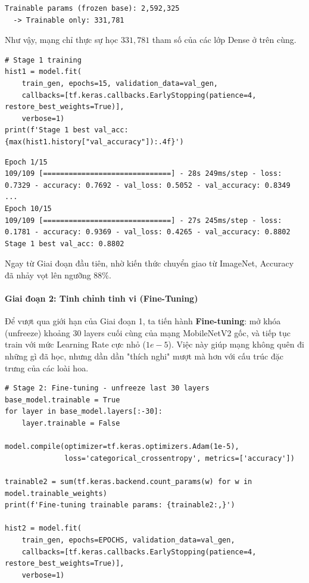 \begin{lstlisting}[style=consoleoutput, caption={Output: Kiểm tra số lượng tham số huấn luyện}]
Trainable params (frozen base): 2,592,325
  -> Trainable only: 331,781
\end{lstlisting}

Như vậy, mạng chỉ thực sự học $331,781$ tham số của các lớp Dense ở trên cùng.

\begin{lstlisting}[style=pythoncode, caption={Huấn luyện Stage 1}]
# Stage 1 training
hist1 = model.fit(
    train_gen, epochs=15, validation_data=val_gen,
    callbacks=[tf.keras.callbacks.EarlyStopping(patience=4, restore_best_weights=True)],
    verbose=1)
print(f'Stage 1 best val_acc: {max(hist1.history["val_accuracy"]):.4f}')
\end{lstlisting}

\begin{lstlisting}[style=consoleoutput, caption={Output: Huấn luyện Giai đoạn 1}]
Epoch 1/15
109/109 [==============================] - 28s 249ms/step - loss: 0.7329 - accuracy: 0.7692 - val_loss: 0.5052 - val_accuracy: 0.8349
...
Epoch 10/15
109/109 [==============================] - 27s 245ms/step - loss: 0.1781 - accuracy: 0.9369 - val_loss: 0.4265 - val_accuracy: 0.8802
Stage 1 best val_acc: 0.8802
\end{lstlisting}

Ngay từ Giai đoạn đầu tiên, nhờ kiến thức chuyển giao từ ImageNet, Accuracy đã nhảy vọt lên ngưỡng $88\%$.

\paragraph{Giai đoạn 2: Tinh chỉnh tinh vi (Fine-Tuning)} \hfill\mbox{}

Để vượt qua giới hạn của Giai đoạn 1, ta tiến hành \textbf{Fine-tuning}: mở khóa (unfreeze) khoảng 30 layers cuối cùng của mạng MobileNetV2 gốc, và tiếp tục train với mức Learning Rate cực nhỏ ($1e-5$). Việc này giúp mạng không quên đi những gì đã học, nhưng dần dần "thích nghi" mượt mà hơn với cấu trúc đặc trưng của các loài hoa.

\begin{lstlisting}[style=pythoncode, caption={Mở băng các layers và huấn luyện Stage 2}]
# Stage 2: Fine-tuning - unfreeze last 30 layers
base_model.trainable = True
for layer in base_model.layers[:-30]:
    layer.trainable = False

model.compile(optimizer=tf.keras.optimizers.Adam(1e-5),
              loss='categorical_crossentropy', metrics=['accuracy'])

trainable2 = sum(tf.keras.backend.count_params(w) for w in model.trainable_weights)
print(f'Fine-tuning trainable params: {trainable2:,}')

hist2 = model.fit(
    train_gen, epochs=EPOCHS, validation_data=val_gen,
    callbacks=[tf.keras.callbacks.EarlyStopping(patience=4, restore_best_weights=True)],
    verbose=1)
\end{lstlisting}

